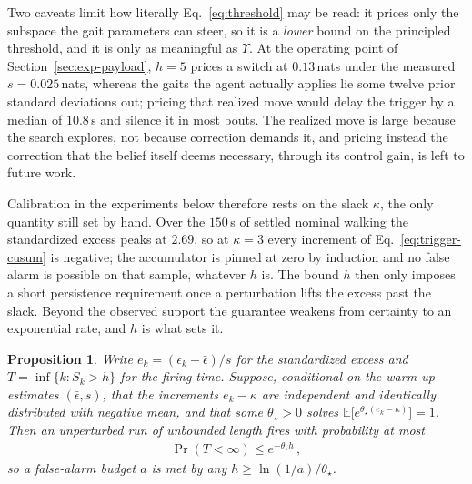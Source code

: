 \documentclass[letterpaper, 10 pt, conference]{ieeeconf}  %
\newtheorem{proposition}{Proposition}
\newcommand{\E}{\mathbb{E}}
\begin{document}
Two caveats limit how literally Eq.~\ref{eq:threshold} may be read: it prices only the subspace the gait parameters can steer, so it is a \emph{lower} bound on the principled threshold, and it is only as meaningful as $\Upsilon$.
At the operating point of Section~\ref{sec:exp-payload}, $h=5$ prices a switch at $0.13$\,nats under the measured $s = 0.025$\,nats, whereas the gaits the agent actually applies lie some twelve prior standard deviations out; pricing that realized move would delay the trigger by a median of $10.8$\,s and silence it in most bouts.
The realized move is large because the search explores, not because correction demands it, and pricing instead the correction that the belief itself deems necessary, through its control gain, is left to future work.

Calibration in the experiments below therefore rests on the slack $\kappa$, the only quantity still set by hand.
Over the $150$\,s of settled nominal walking the standardized excess peaks at $2.69$, so at $\kappa = 3$ every increment of Eq.~\ref{eq:trigger-cusum} is negative; the accumulator is pinned at zero by induction and no false alarm is possible on that sample, whatever $h$ is.
The bound $h$ then only imposes a short persistence requirement once a perturbation lifts the excess past the slack.
Beyond the observed support the guarantee weakens from certainty to an exponential rate, and $h$ is what sets it.

\begin{proposition} \label{prop:fpr}
Write $e_k = (\epsilon_k - \bar{\epsilon})/s$ for the standardized excess and $T = \inf\{k : S_k > h\}$ for the firing time.
Suppose, conditional on the warm-up estimates $(\bar{\epsilon}, s)$, that the increments $e_k - \kappa$ are independent and identically distributed with negative mean, and that some $\theta_{\star} > 0$ solves $\E\big[e^{\theta_{\star}(e_k - \kappa)}\big] = 1$.
Then an unperturbed run of unbounded length fires with probability at most
\begin{align} \label{eq:lundberg}
    \Pr(T < \infty) \leq e^{-\theta_{\star} h} \,,
\end{align}
so a false-alarm budget $a$ is met by any $h \geq \ln(1/a)/\theta_{\star}$.
\end{proposition}
\end{document}
